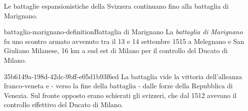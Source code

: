 \documentclass[preview]{standalone}
\begin{document}
\begin{plainhtml}
    Le battaglie espansionistiche della Svizzera continuano fino alla battaglia di Marignano.
\end{plainhtml}

\begin{snippetdefinition}{battaglia-marignano-definition}{Battaglia di Marignano}
    La \textit{battaglia di Marignano} fu uno scontro armato avvenuto tra il 13 e 14
    settembre 1515 a Melegnano e San Giuliano Milanese,
    16 km a sud est di Milano per il controllo del Ducato di Milano. 
\end{snippetdefinition}

\begin{snippet}{35b6149a-198d-42dc-9bff-e05d1b93f6ed}
    La battaglia vide la vittoria dell'alleanza franco-veneta
    e - verso la fine della battaglia - dalle forze della Repubblica di Venezia.
    Sul fronte opposto erano schierati gli svizzeri, che dal 1512 avevano il controllo
    effettivo del Ducato di Milano.
\end{snippet}

\end{document}

